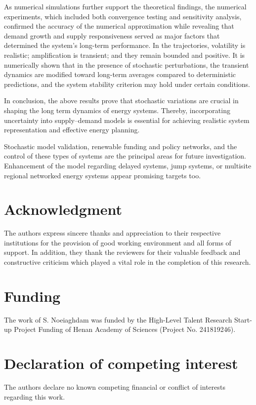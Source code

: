 \documentclass[11pt]{article}
\numberwithin{equation}{section}
\begin{document}
As numerical simulations further support the theoretical findings, the numerical experiments, which included both convergence testing and sensitivity analysis, confirmed the accuracy of the numerical approximation while revealing that demand growth and supply responsiveness served as major factors that determined the system's long-term performance. In the trajectories, volatility is realistic; amplification is transient; and they remain bounded and positive. It is numerically shown that in the presence of stochastic perturbations, the transient dynamics are modified toward long-term averages compared to deterministic predictions, and the system stability criterion may hold under certain conditions.

In conclusion, the above results prove that stochastic variations are crucial in shaping the long term dynamics of energy systems. Thereby, incorporating uncertainty into supply–demand models is essential for achieving realistic system representation and effective energy planning.

Stochastic model validation, renewable funding and policy networks, and the control of these types of systems are the principal areas for future investigation. Enhancement of the model regarding delayed systems, jump systems, or multisite regional networked energy systems appear promising targets too.\\

\section*{Acknowledgment}
The authors express sincere thanks and appreciation to their respective institutions for the provision of good working environment and all forms of support. In addition, they thank the reviewers for their valuable feedback and constructive criticism which played a vital role in the completion of this research.

\section*{Funding} The work of S. Noeiaghdam was funded by the High-Level Talent Research Start-up Project Funding of Henan Academy of Sciences (Project No. 241819246).

\section*{Declaration of competing interest}
The authors declare no known competing financial or conflict of interests regarding this work.
\end{document}
